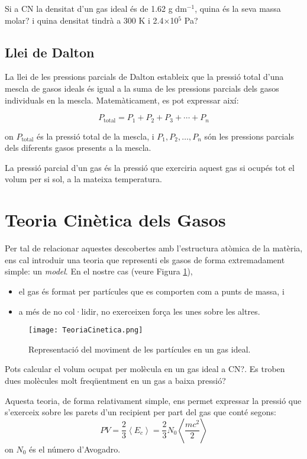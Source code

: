        
    \begin{exr}
        Si a CN la densitat d'un gas ideal és de 1.62 g dm$^{-1}$, quina és la seva massa molar? i quina densitat tindrà a 300 K i 2.4$\times$10$^5$ Pa?
        \end{exr}

\subsection{Llei de Dalton}
La llei de les pressions parcials de Dalton estableix que la pressió total d'una mescla de gasos ideals és igual a la suma de les pressions parcials dels gasos individuals en la mescla. Matemàticament, es pot expressar així:

\[
P_{\text{total}} = P_1 + P_2 + P_3 + \cdots + P_n
\]

on \(P_{\text{total}}\) és la pressió total de la mescla, i \(P_1, P_2, \dots, P_n\) són les pressions parcials dels diferents gasos presents a la mescla.

La pressió parcial d'un gas és la pressió que exerciria aquest gas si ocupés tot el volum per si sol, a la mateixa temperatura.
  


\section{Teoria Cinètica dels Gasos}

Per tal de relacionar aquestes descobertes amb l'estructura atòmica de la matèria, ens cal introduir una teoria que representi els gasos de forma extremadament simple: un \textit{model}. En el nostre cas (veure Figura \ref{fig:TeoriaCinetica}),
\begin{itemize}
\item el gas és format per partícules que es comporten com a punts de massa, i
\item a més de no col·lidir, no exerceixen força les unes sobre les altres.
\end{itemize}
\begin{figure}[h]
\centering
\texttt{[image: TeoriaCinetica.png]}
\caption{Representació del moviment de les partícules en un gas ideal.}
\label{fig:TeoriaCinetica}
\end{figure}
\begin{exr}
Pots calcular el volum ocupat per molècula en un gas ideal a CN?. Es troben dues molècules molt freqüentment en un gas a baixa pressió?
\end{exr}
Aquesta teoria, de forma relativament simple, ens permet expressar la pressió que s'exerceix sobre les parets d'un recipient per part del gas que conté segons:
\[
PV=\frac{2}{3} \left< E_c \right> = \frac{2}{3} N_0 \left< \frac{mc^2}{2} \right>
\]
on $N_0$ és el número d'Avogadro.

